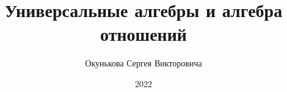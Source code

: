 \documentclass[spec, och, labwork]{shiza}
\begin{document}
\chair{}

\title{Универсальные алгебры и алгебра отношений}






\author{Окунькова Сергея Викторовича}








\date{2022}

\maketitle

\end{document}
